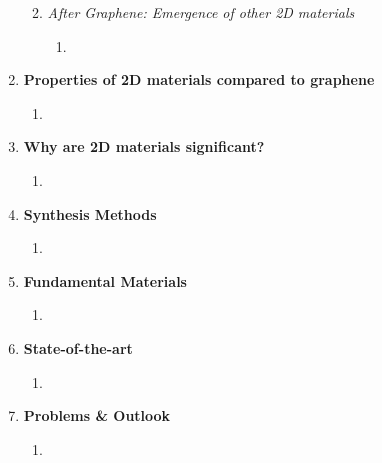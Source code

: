 \documentclass{article}
\begin{document}
\begin{enumerate}
\begin{enumerate}
\begin{enumerate}
			\end{enumerate}	%
		\item{\textit{After Graphene: Emergence of other 2D materials}}
			\begin{enumerate} %
				\item{}
			\end{enumerate} %
	\end{enumerate} %
	\item{\textbf{Properties of 2D materials compared to graphene}}
		\begin{enumerate} %
			\item{}
		\end{enumerate} %
	\item{\textbf{Why are 2D materials significant?}}
		\begin{enumerate} %
			\item{}
		\end{enumerate} %
	\item{\textbf{Synthesis Methods}}
		\begin{enumerate} %
			\item{}
		\end{enumerate} %
	\item{\textbf{Fundamental Materials}} 
		\begin{enumerate}	%
			\item{}
		\end{enumerate} %
	\item{\textbf{State-of-the-art}}
		\begin{enumerate} %
			\item{}
		\end{enumerate}	%
	\item{\textbf{Problems \& Outlook}}
		\begin{enumerate}	%
			\item{}
		\end{enumerate} %
\end{enumerate} %



\end{document}
